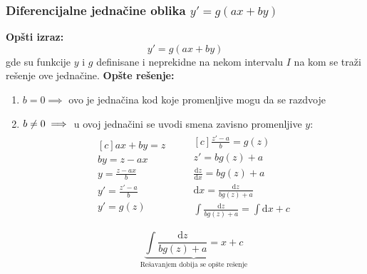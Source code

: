 \subsubsection{Diferencijalne jednačine oblika $y'=g(ax+by)$}
\textbf{Opšti izraz:}
$$y'=g(ax+by)$$
gde su funkcije $y$ i $g$ definisane i neprekidne na nekom intervalu $I$ na kom se traži rešenje ove jednačine.
\textbf{Opšte rešenje:}
\begin{enumerate}[label = \alph*)]
	\item
		$b=0 \implies$ ovo je jednačina kod koje promenljive mogu da se razdvoje
	\item
		$b \centernot = 0 \implies$ u ovoj jednačini se uvodi smena zavisno promenljive $y$:
		\begin{align*}
			\begin{aligned}[c]
				ax+by=z\\
				by = z-ax\\
				y = \frac{z-ax}{b}\\
				y' = \frac{z'-a}{b}\\	
				y' = g(z)\\	
			\end{aligned}
			\quad \quad
			\begin{aligned}[c]
				\frac{z'-a}{b} = g(z)\\
				z' = bg(z)+a\\
				\frac{\mathrm{d}z}{\mathrm{d}x} = bg(z)+a\\
				\mathrm{d}x = \frac{\mathrm{d}z}{bg(z)+a}\\
				\int\frac{\mathrm{d}z}{bg(z)+a} = \int \mathrm{d}x + c\\
			\end{aligned}\\		
		\end{align*}
		$$\underbrace{\int\frac{\mathrm{d}z}{bg(z)+a} = x + c}_{\text{Rešavanjem dobija se opšte rešenje}}$$
\end{enumerate}


